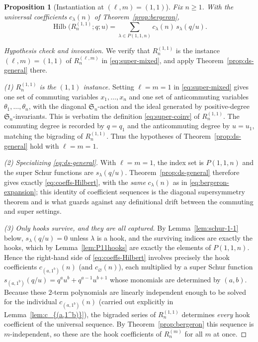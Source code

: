 \documentclass[11pt]{amsart}
\newtheorem{proposition}[theorem]{Proposition}
\theoremstyle{definition}
\DeclareMathOperator{\Hilb}{Hilb}
\begin{document}
\begin{proposition}[Instantiation at $(\ell,m)=(1,1)$]\label{prop:ds}
Fix $n\ge1$. With the universal coefficients $c_\lambda(n)$ of
Theorem~\ref{prop:bergeron},
\begin{equation}\label{eq:coeffs-Hilbert}
\Hilb\big(R_n^{(1,1)}; q;u\big) = \sum_{\lambda \in P(1,1,n)}
c_{\lambda}(n)\, s_\lambda(q/u).
\end{equation}
\end{proposition}

\begin{proof}[Hypothesis check and invocation]
We verify that $R_n^{(1,1)}$ is the instance $(\ell,m)=(1,1)$ of $R_n^{(\ell,m)}$
in \eqref{eq:super-mixed}, and apply Theorem~\ref{prop:ds-general} there.

\smallskip\noindent\emph{(1) $R_n^{(1,1)}$ is the $(1,1)$ instance.} Setting
$\ell=m=1$ in \eqref{eq:super-mixed} gives one set of commuting variables
$x_1,\dots,x_n$ and one set of anticommuting variables $\theta_1,\dots,\theta_n$,
with the diagonal $\mathfrak{S}_n$-action and the ideal generated by
positive-degree $\mathfrak{S}_n$-invariants. This is verbatim the definition
\eqref{eq:super-coinv} of $R_n^{(1,1)}$. The commuting degree is recorded by
$q=q_1$ and the anticommuting degree by $u=u_1$, matching the bigrading of
$R_n^{(1,1)}$. Thus the hypotheses of Theorem~\ref{prop:ds-general} hold with
$\ell=m=1$.

\smallskip\noindent\emph{(2) Specializing \eqref{eq:ds-general}.} With $\ell=m=1$,
the index set is $P(1,1,n)$ and the super Schur functions are
$s_\lambda(q/u)$. Theorem~\ref{prop:ds-general} therefore gives exactly
\eqref{eq:coeffs-Hilbert}, with the \emph{same} $c_\lambda(n)$ as in
\eqref{eq:bergeron-expansion}; this identity of coefficient sequences is the
diagonal supersymmetry theorem and is what guards against any definitional drift
between the commuting and super settings.

\smallskip\noindent\emph{(3) Only hooks survive, and they are all captured.} By
Lemma~\ref{lem:schur-1-1} below, $s_\lambda(q/u)=0$ unless $\lambda$ is a hook, and
the surviving indices are exactly the hooks, which by Lemma~\ref{lem:P11hooks} are
exactly the elements of $P(1,1,n)$. Hence the right-hand side of
\eqref{eq:coeffs-Hilbert} involves precisely the hook coefficients
$c_{(a,1^b)}(n)$ (and $c_\varnothing(n)$), each multiplied by a super Schur function
$s_{(a,1^b)}(q/u)=q^au^b+q^{a-1}u^{b+1}$ whose monomials are determined by
$(a,b)$. Because these $2$-term polynomials are linearly independent enough to be
solved for the individual $c_{(a,1^b)}(n)$ (carried out explicitly in
Lemma~\ref{lem:c_{(a,1^b)}}), the bigraded series of $R_n^{(1,1)}$ determines
\emph{every} hook coefficient of the universal sequence. By
Theorem~\ref{prop:bergeron} this sequence is $m$-independent, so these are the hook
coefficients of $R_n^{(m)}$ for all $m$ at once.
\end{proof}
\end{document}
